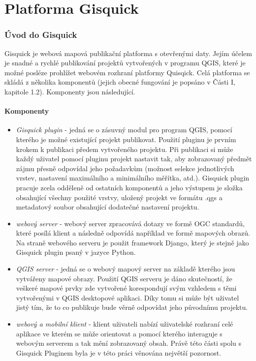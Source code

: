 \newpage
\part{Platforma Gisquick}
\newpage

\section{Úvod do Gisquick}

Gisquick je webová mapová publikační platforma s otevřenými daty. Jejím účelem je snadné a rychlé publikování projektů vytvořených v programu QGIS, které je možné posléze prohlížet webovém rozhraní platformy Quisqick. 
Celá platforma se skládá z několika komponentů (jejich obecné fungování je popsáno v Části I, kapitole 1.2). Komponenty jsou následující.

\subsection{Komponenty}

\begin{itemize}
	\item\textit{Gisquick plugin} - jedná se o zásuvný modul pro program QGIS, pomocí kterého je možné existující projekt publikovat. Použití pluginu je prvním krokem k publikaci předem vytvořeného projektu. Při publikaci si může každý uživatel pomocí pluginu projekt nastavit tak, aby zobrazovaný předmět zájmu přesně odpovídal jeho požadavkům (možnost selekce jednotlivých vrstev, nastavení maximálního a minimálního měřítka, atd.). Gisquick plugin pracuje zcela odděleně od ostatních komponentů a jeho výstupem je složka obsahující všechny použité vrstvy, uložený projekt ve formátu .qgs a metadatový soubor obsahující dodatečné nastavení projektu.
	\item\textit{webový server} - webový server zpracovává dotazy ve formě OGC standardů, které posílá klient a následně odpovídá například ve formě mapových obrazů. Na straně webového serveru je použit framework Django, který je stejně jako Gisquick plugin psaný v jazyce Python.
	\item\textit{QGIS server} - jedná se o webový mapový server na základě kterého jsou vytvářeny mapové obrazy. Použití QGIS serveru je dáno skutečností, že veškeré mapové prvky zde vytvořené korespondují svým vzhledem s těmi vytvořenými v QGIS desktopové aplikaci. Díky tomu si může být uživatel jistý tím, že to co publikuje bude věrně odpovídat jeho původnímu projektu.
	\item\textit{webový a mobilní klient} - klient uživateli nabízí uživatelské rozhraní celé aplikace ve kterém se může orientovat a pomocí kterého interaguje s webovým serverem a tak mění zobrazovaný obsah. Právě této části spolu s Gisquick Pluginem byla je v této práci věnována největší pozornost.
\end{itemize}

